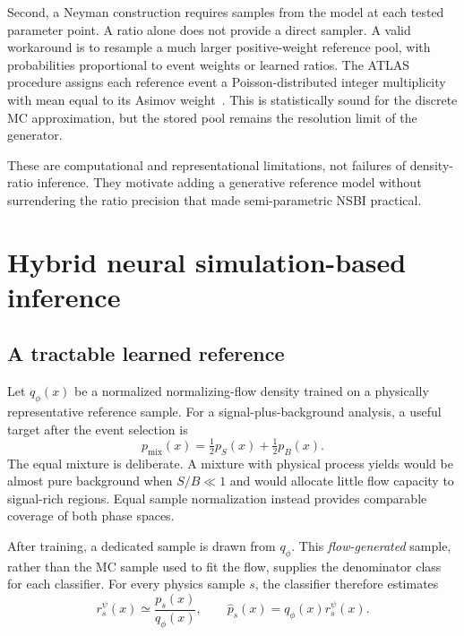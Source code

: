 \documentclass[
  aps,
  prd,
  superscriptaddress,
  nofootinbib,
  longbibliography,
  12pt
]{revtex4-2}
\newcommand{\qRef}{q_{\phi}}
\begin{document}
Second, a Neyman construction requires samples from the model at each tested parameter point.  A ratio alone does not provide a direct sampler.  A valid workaround is to resample a much larger positive-weight reference pool, with probabilities proportional to event weights or learned ratios.  The ATLAS procedure assigns each reference event a Poisson-distributed integer multiplicity with mean equal to its Asimov weight~\cite{ATLAS:2024rpr}.  This is statistically sound for the discrete MC approximation, but the stored pool remains the resolution limit of the generator.

These are computational and representational limitations, not failures of density-ratio inference.  They motivate adding a generative reference model without surrendering the ratio precision that made semi-parametric NSBI practical.

\section{Hybrid neural simulation-based inference}
\label{sec:hybrid}

\subsection{A tractable learned reference}

Let $\qRef(x)$ be a normalized normalizing-flow density trained on a physically representative reference sample.  For a signal-plus-background analysis, a useful target after the event selection is
\begin{equation}
  p_{\mathrm{mix}}(x)=\tfrac12p_S(x)+\tfrac12p_B(x).
  \label{eq:balanced-reference}
\end{equation}
The equal mixture is deliberate.  A mixture with physical process yields would be almost pure background when $S/B\ll1$ and would allocate little flow capacity to signal-rich regions.  Equal sample normalization instead provides comparable coverage of both phase spaces.

After training, a dedicated sample is drawn from $\qRef$.  This \emph{flow-generated} sample, rather than the MC sample used to fit the flow, supplies the denominator class for each classifier.  For every physics sample $s$, the classifier therefore estimates
\begin{equation}
  r_s^\psi(x)\simeq\frac{p_s(x)}{\qRef(x)},
  \qquad
  \widehat p_s(x)=\qRef(x)r_s^\psi(x).
  \label{eq:hybrid-density}
\end{equation}
\end{document}
